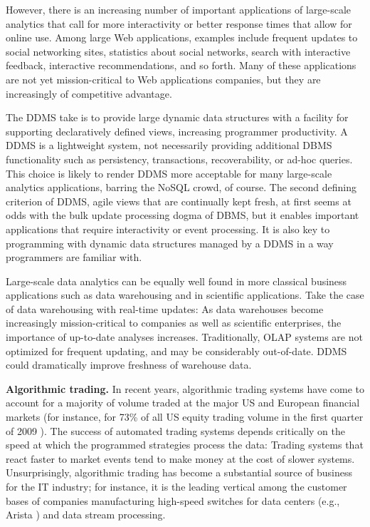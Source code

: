However, there is an increasing number of important applications of large-scale analytics that call for more interactivity or better response times that allow for online use. Among large Web applications, examples include frequent updates to social networking sites, statistics about social networks, search with interactive feedback, interactive recommendations, and so forth.
Many of these applications are not yet mission-critical to Web applications companies, but they are increasingly of competitive advantage.

The DDMS take is to provide large dynamic data structures with a facility for supporting declaratively defined views, increasing programmer productivity. A DDMS is a lightweight system, not necessarily providing additional DBMS functionality such as persistency, transactions, recoverability, or ad-hoc queries. This choice is likely to render DDMS more acceptable for many large-scale analytics applications, barring the NoSQL crowd, of course. The second defining criterion of DDMS, agile views that are continually kept fresh, at first seems at odds with the bulk update processing dogma of DBMS, but it enables important applications that require interactivity or event processing. It is also key to programming with dynamic data structures managed by a DDMS in a way programmers are familiar with.

Large-scale data analytics can be equally well found in more classical business applications such as data warehousing and in scientific applications. Take the case of data warehousing with real-time updates:
As data warehouses become increasingly mission-critical to companies as well as scientific enterprises, the importance of up-to-date analyses increases. Traditionally, OLAP systems are not optimized for frequent updating, and may be considerably out-of-date. DDMS could dramatically improve freshness of warehouse data.

\medskip

{\bf Algorithmic trading.}\/
In recent years, algorithmic trading systems have come to account for a majority of volume traded at the major US and European financial markets (for instance, for 73\% of all US equity trading volume in the first quarter of 2009 \cite{Iati2009}). The success of automated trading systems depends critically on the speed at which the programmed strategies process the data: Trading systems that react faster to market events tend to make money at the cost of slower systems.
Unsurprisingly, algorithmic trading has become a substantial source of business for the IT industry; for instance, it is the leading vertical among the customer bases of companies manufacturing high-speed switches for data centers
(e.g., Arista \cite{Becht2010}) and data stream processing.

